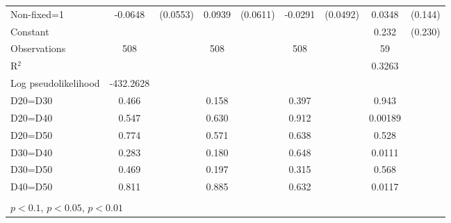 \begin{tabular}{l|cccccc|cc}
Non-fixed=1     &  -0.0648         & (0.0553)&   0.0939         & (0.0611)&  -0.0291         & (0.0492)&   0.0348         &  (0.144)\\
Constant        &                  &         &                  &         &                  &         &    0.232         &  (0.230)\\
\hline
Observations    &      508         &         &      508         &         &      508         &         &       59         &         \\
R$^2$      &                  &         &                  &         &                  &         &       0.3263    &   \\ 
Log pseudolikelihood  &  -432.2628   &         &                  &         &                  &         &           &   \\ 
D20=D30         &    0.466         &         &    0.158         &         &    0.397         &         &    0.943         &         \\
D20=D40         &    0.547         &         &    0.630         &         &    0.912         &         &  0.00189         &         \\
D20=D50         &    0.774         &         &    0.571         &         &    0.638         &         &    0.528         &         \\
D30=D40         &    0.283         &         &    0.180         &         &    0.648         &         &   0.0111         &         \\
D30=D50         &    0.469         &         &    0.197         &         &    0.315         &         &    0.568         &         \\
D40=D50         &    0.811         &         &    0.885         &         &    0.632         &         &   0.0117         &         \\
\hline\hline
\multicolumn{9}{p{16cm}}{\tiny }\\
\multicolumn{9}{l}{\tiny \sym{*} \(p<0.1\), \sym{**} \(p<0.05\), \sym{***} \(p<0.01\)}\\
\end{tabular}
